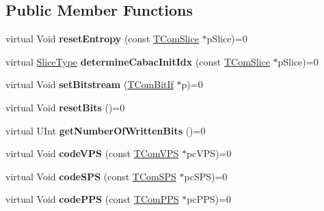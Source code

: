 \subsection*{Public Member Functions}
\begin{DoxyCompactItemize}
\item 
\mbox{\label{class_t_enc_entropy_if_aa7021d32258ed76e2dd49165266da9e7}} 
virtual Void {\bfseries reset\+Entropy} (const \hyperlink{class_t_com_slice}{T\+Com\+Slice} $\ast$p\+Slice)=0
\item 
\mbox{\label{class_t_enc_entropy_if_a59432a20451e00972632cce79846c6d6}} 
virtual \hyperlink{_type_def_8h_a8fc5fd31653a387f7430d29863620f71}{Slice\+Type} {\bfseries determine\+Cabac\+Init\+Idx} (const \hyperlink{class_t_com_slice}{T\+Com\+Slice} $\ast$p\+Slice)=0
\item 
\mbox{\label{class_t_enc_entropy_if_abeca15304dc7673a879d7a1db51b017a}} 
virtual Void {\bfseries set\+Bitstream} (\hyperlink{class_t_com_bit_if}{T\+Com\+Bit\+If} $\ast$p)=0
\item 
\mbox{\label{class_t_enc_entropy_if_abf39203d4bfab1951f37b30c306ee584}} 
virtual Void {\bfseries reset\+Bits} ()=0
\item 
\mbox{\label{class_t_enc_entropy_if_aa39f61c750036ef6c76e3586b43825ee}} 
virtual U\+Int {\bfseries get\+Number\+Of\+Written\+Bits} ()=0
\item 
\mbox{\label{class_t_enc_entropy_if_a00152437c8535a425319ad40b074004c}} 
virtual Void {\bfseries code\+V\+PS} (const \hyperlink{class_t_com_v_p_s}{T\+Com\+V\+PS} $\ast$pc\+V\+PS)=0
\item 
\mbox{\label{class_t_enc_entropy_if_ad4b83fd4f50c20ab27290239928c13a6}} 
virtual Void {\bfseries code\+S\+PS} (const \hyperlink{class_t_com_s_p_s}{T\+Com\+S\+PS} $\ast$pc\+S\+PS)=0
\item 
\mbox{\label{class_t_enc_entropy_if_aa43716eb376c2739e883afb57a7b4d0c}} 
virtual Void {\bfseries code\+P\+PS} (const \hyperlink{class_t_com_p_p_s}{T\+Com\+P\+PS} $\ast$pc\+P\+PS)=0

\end{DoxyCompactItemize}
